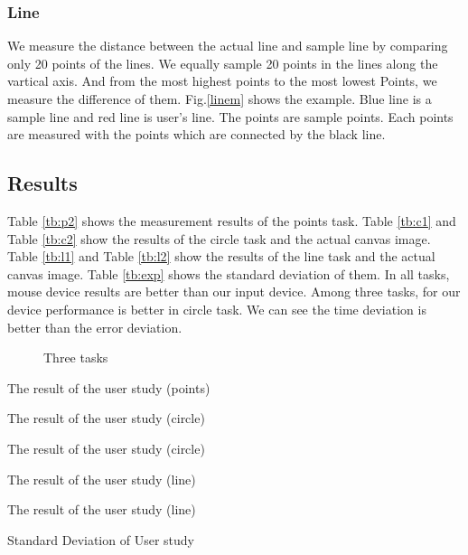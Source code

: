 \subsubsection{Line}
We measure the distance between the actual line and sample line by comparing only 20 points of the lines. We equally sample 20 points in the lines along the vartical axis. And from the most highest points to the most lowest Points, we measure the difference of them.
Fig.\ref{linem} shows the example. Blue line is a sample line and red line is user's line. The points are sample points. Each points are measured with the points which are connected by the black line.
\subsection{Results}
Table \ref{tb:p2} shows the measurement results of the points task. Table \ref{tb:c1} and Table \ref{tb:c2} show the results of the circle task and the actual canvas image. Table \ref{tb:l1} and Table \ref{tb:l2} show the results of the line task and the actual canvas image. Table \ref{tb:exp} shows the standard deviation of them. In all tasks, mouse device results are better than our input device. Among three tasks, for our device performance is better in circle task. We can see the time deviation is better than the error deviation.
\begin{figure}

 \caption{Three tasks}
 \label{task}
\end{figure}

\begin{table}[htbp]
 \centering
 \caption{The result of the user study (points)}
 \label{tb:p2}
 
\end{table}


\begin{table}[htbp]
 \centering
 \caption{The result of the user study (circle)}
 \label{tb:c1}
 
\end{table}



\begin{table}[htbp]
 \centering
 \caption{The result of the user study (circle)}
 \label{tb:c2}
 
\end{table}

\begin{table}[htbp]
 \centering
 \caption{The result of the user study (line)}
 \label{tb:l1}
 
\end{table}


\begin{table}[htbp]
 \centering
 \caption{The result of the user study (line)}
 
 \label{tb:l2}
\end{table}




\begin{table}[htbp]
 \centering
 \caption{Standard Deviation of User study}
 \label{tb:exp}
 
\end{table}
